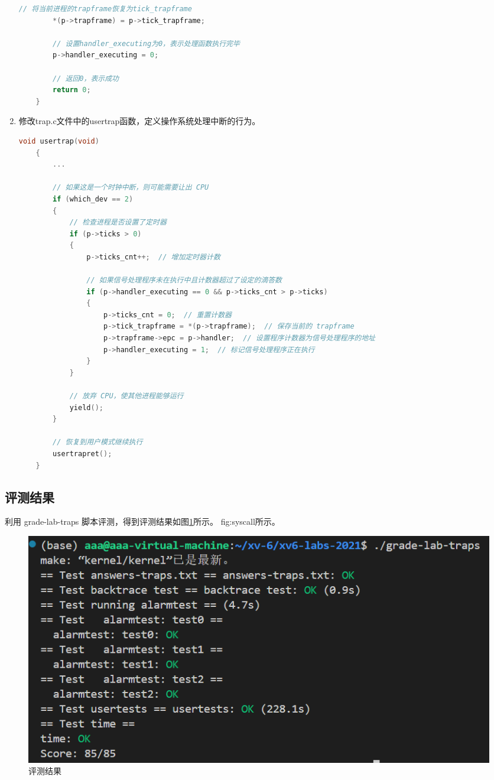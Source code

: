 \begin{enumerate}
\begin{lstlisting}[language=c,title=sys\_sigreturn的实现]
        // 将当前进程的trapframe恢复为tick_trapframe
        *(p->trapframe) = p->tick_trapframe;
    
        // 设置handler_executing为0，表示处理函数执行完毕
        p->handler_executing = 0;
        
        // 返回0，表示成功
        return 0;
    }
        \end{lstlisting}
    \item 修改trap.c文件中的usertrap函数，定义操作系统处理中断的行为。
          \begin{lstlisting}[language=c,title=对usertrap函数的修改]
    void usertrap(void)
    {
        ...

        // 如果这是一个时钟中断，则可能需要让出 CPU
        if (which_dev == 2)
        {
            // 检查进程是否设置了定时器
            if (p->ticks > 0)
            {
                p->ticks_cnt++;  // 增加定时器计数

                // 如果信号处理程序未在执行中且计数器超过了设定的滴答数
                if (p->handler_executing == 0 && p->ticks_cnt > p->ticks)
                {
                    p->ticks_cnt = 0;  // 重置计数器
                    p->tick_trapframe = *(p->trapframe);  // 保存当前的 trapframe
                    p->trapframe->epc = p->handler;  // 设置程序计数器为信号处理程序的地址
                    p->handler_executing = 1;  // 标记信号处理程序正在执行
                }
            }

            // 放弃 CPU，使其他进程能够运行
            yield();
        }

        // 恢复到用户模式继续执行
        usertrapret();
    }
    \end{lstlisting}
\end{enumerate}
\subsection{评测结果}
利用 grade-lab-traps 脚本评测，得到评测结果如图\ref{fig:traps}所示。
{fig:syscall}所示。
\begin{figure}[h]
    \centering
    \includegraphics[width=\linewidth]{pics/traps评测结果.png}
    \caption{评测结果}
    \label{fig:traps}
\end{figure}


